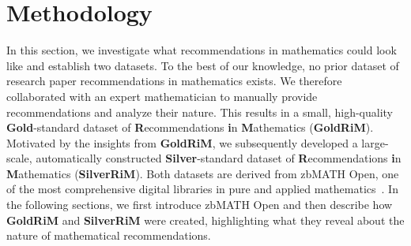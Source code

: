 \documentclass[sigconf,anonymous]{acmart}
\begin{document}

\section{Methodology}

In this section, we investigate what recommendations in mathematics could look like and establish two datasets.
To the best of our knowledge, no prior dataset of research paper recommendations in mathematics exists.
We therefore collaborated with an expert mathematician to manually provide recommendations and analyze their nature.
This results in a small, high-quality \textbf{Gold}-standard dataset of \textbf{R}ecommendations \textbf{i}n \textbf{M}athematics (\textbf{GoldRiM}).
Motivated by the insights from \textbf{GoldRiM}, we subsequently developed a large-scale, automatically constructed \textbf{Silver}-standard dataset of \textbf{R}ecommendations \textbf{i}n \textbf{M}athematics (\textbf{SilverRiM}).
Both datasets are derived from zbMATH Open, one of the most comprehensive digital libraries in pure and applied mathematics~\cite{deb2024zbmathovrvw}.
In the following sections, we first introduce zbMATH Open and then describe how \textbf{GoldRiM} and \textbf{SilverRiM} were created, highlighting what they reveal about the nature of mathematical recommendations.
\end{document}
